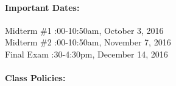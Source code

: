 \documentclass[11pt, a4paper]{article}
\begin{document}
\paragraph{Important Dates:}
\begin{center} \begin{minipage}{3.8in}
\begin{flushleft}
Midterm \#1      :00-10:50am, October 3, 2016  \\
Midterm \#2      :00-10:50am, November 7, 2016\\
Final Exam       :30-4:30pm, December 14, 2016\\
\end{flushleft}
\end{minipage}
\end{center}

\paragraph{Class Policies:}  
\end{document}
